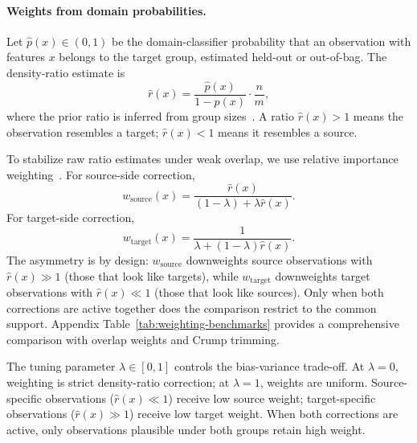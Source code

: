 \paragraph{Weights from domain probabilities.}
Let $\hat{p}(x) \in (0, 1)$ be the domain-classifier probability that an observation with features $x$ belongs to the target group, estimated held-out or out-of-bag. The density-ratio estimate is
\begin{equation}
  \hat{r}(x) = \frac{\hat{p}(x)}{1 - \hat{p}(x)} \cdot \frac{n}{m},
\end{equation}
where the prior ratio is inferred from group sizes~\cite{Bickel_2007}. A ratio $\hat{r}(x) > 1$ means the observation resembles a target; $\hat{r}(x) < 1$ means it resembles a source.

To stabilize raw ratio estimates under weak overlap, we use relative importance weighting~\cite{Yamada_2013}. For source-side correction,
\begin{equation}
  w_{\mathrm{source}}(x) = \frac{\hat{r}(x)}{(1 - \lambda) + \lambda \hat{r}(x)}.
\end{equation}
For target-side correction,
\begin{equation}
  w_{\mathrm{target}}(x) = \frac{1}{\lambda + (1 - \lambda) \hat{r}(x)}.
\end{equation}
The asymmetry is by design: $w_{\mathrm{source}}$ downweights source observations with $\hat{r}(x) \gg 1$ (those that look like targets), while $w_{\mathrm{target}}$ downweights target observations with $\hat{r}(x) \ll 1$ (those that look like sources). Only when both corrections are active together does the comparison restrict to the common support. Appendix Table~\ref{tab:weighting-benchmarks} provides a comprehensive comparison with overlap weights and Crump trimming.

The tuning parameter $\lambda \in [0, 1]$ controls the bias-variance trade-off. At $\lambda = 0$, weighting is strict density-ratio correction; at $\lambda = 1$, weights are uniform. Source-specific observations ($\hat{r}(x) \ll 1$) receive low source weight; target-specific observations ($\hat{r}(x) \gg 1$) receive low target weight. When both corrections are active, only observations plausible under both groups retain high weight.

